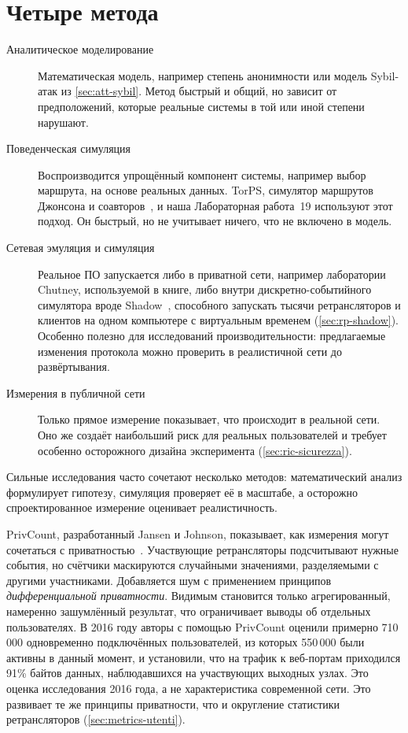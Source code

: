 \section{Четыре метода}\label{sec:ric-metodi}

\begin{description}
  \item[Аналитическое моделирование] Математическая модель, например степень анонимности или модель Sybil-атак из \cref{sec:att-sybil}. Метод быстрый и общий, но зависит от предположений, которые реальные системы в той или иной степени нарушают.
  \item[Поведенческая симуляция] Воспроизводится упрощённый компонент системы, например выбор маршрута, на основе реальных данных. TorPS, симулятор маршрутов Джонсона и соавторов~\cite{johnson2013users}, и наша Лабораторная работа~19 используют этот подход. Он быстрый, но не учитывает ничего, что не включено в модель.
  \item[Сетевая эмуляция и симуляция] Реальное ПО запускается либо в приватной сети, например лаборатории Chutney, используемой в книге, либо внутри дискретно-событийного симулятора вроде Shadow~\cite{jansen2012shadow}, способного запускать тысячи ретрансляторов и клиентов на одном компьютере с виртуальным временем (\cref{sec:rp-shadow}). Особенно полезно для исследований производительности: предлагаемые изменения протокола можно проверить в реалистичной сети до развёртывания.
  \item[Измерения в публичной сети] Только прямое измерение показывает, что происходит в реальной сети. Оно же создаёт наибольший риск для реальных пользователей и требует особенно осторожного дизайна эксперимента (\cref{sec:ric-sicurezza}).
\end{description}
Сильные исследования часто сочетают несколько методов: математический анализ формулирует гипотезу, симуляция проверяет её в масштабе, а осторожно спроектированное измерение оценивает реалистичность.

\begin{approfondimento}
PrivCount, разработанный Jansen и Johnson, показывает, как измерения могут сочетаться с приватностью~\cite{jansen2016privcount}. Участвующие ретрансляторы подсчитывают нужные события, но счётчики маскируются случайными значениями, разделяемыми с другими участниками. Добавляется шум с применением принципов \emph{дифференциальной приватности}. Видимым становится только агрегированный, намеренно зашумлённый результат, что ограничивает выводы об отдельных пользователях. В 2016 году авторы с помощью PrivCount оценили примерно 710\,000 одновременно подключённых пользователей, из которых 550\,000 были активны в данный момент, и установили, что на трафик к веб-портам приходился 91\% байтов данных, наблюдавшихся на участвующих выходных узлах. Это оценка исследования 2016 года, а не характеристика современной сети. Это развивает те же принципы приватности, что и округление статистики ретрансляторов (\cref{sec:metrics-utenti}).
\end{approfondimento}

